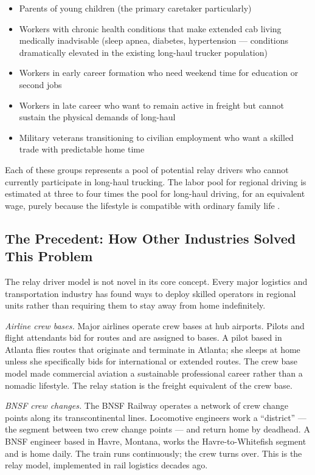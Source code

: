 \begin{itemize}
\item Parents of young children (the primary caretaker particularly)
\item Workers with chronic health conditions that make extended cab living medically
      inadvisable (sleep apnea, diabetes, hypertension --- conditions dramatically
      elevated in the existing long-haul trucker population)
\item Workers in early career formation who need weekend time for education or second jobs
\item Workers in late career who want to remain active in freight but cannot sustain
      the physical demands of long-haul
\item Military veterans transitioning to civilian employment who want a skilled trade
      with predictable home time
\end{itemize}

Each of these groups represents a pool of potential relay drivers who cannot currently
participate in long-haul trucking. The labor pool for regional driving is estimated at
three to four times the pool for long-haul driving, for an equivalent wage, purely
because the lifestyle is compatible with ordinary family life \citep{BLS_trucking2023}.

\subsection{The Precedent: How Other Industries Solved This Problem}

The relay driver model is not novel in its core concept. Every major logistics and
transportation industry has found ways to deploy skilled operators in regional units
rather than requiring them to stay away from home indefinitely.

\textit{Airline crew bases.} Major airlines operate crew bases at hub airports. Pilots
and flight attendants bid for routes and are assigned to bases. A pilot based in Atlanta
flies routes that originate and terminate in Atlanta; she sleeps at home unless
she specifically bids for international or extended routes. The crew base model made
commercial aviation a sustainable professional career rather than a nomadic lifestyle.
The relay station is the freight equivalent of the crew base.

\textit{BNSF crew changes.} The BNSF Railway operates a network of crew change points
along its transcontinental lines. Locomotive engineers work a ``district'' --- the segment
between two crew change points --- and return home by deadhead. A BNSF engineer
based in Havre, Montana, works the Havre-to-Whitefish segment and is home daily.
The train runs continuously; the crew turns over. This is the relay model, implemented
in rail logistics decades ago.

